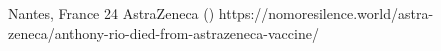           {Nantes, France}
          {24}
          {AstraZeneca}
          {}
          {
             ()
          }
          {https://nomoresilence.world/astra-zeneca/anthony-rio-died-from-astrazeneca-vaccine/}

